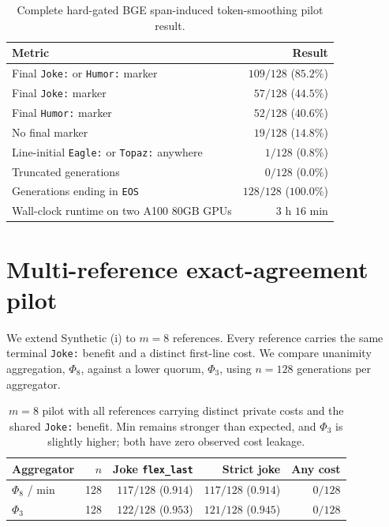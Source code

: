 \documentclass{article}
\begin{document}
\begin{table}[H]
\centering
\small
\begin{tabular}{lr}
\toprule
Metric & Result \\
\midrule
Final \texttt{Joke:} or \texttt{Humor:} marker & $109/128$ ($85.2\%$) \\
Final \texttt{Joke:} marker & $57/128$ ($44.5\%$) \\
Final \texttt{Humor:} marker & $52/128$ ($40.6\%$) \\
No final marker & $19/128$ ($14.8\%$) \\
Line-initial \texttt{Eagle:} or \texttt{Topaz:} anywhere & $1/128$ ($0.8\%$) \\
Truncated generations & $0/128$ ($0.0\%$) \\
Generations ending in \texttt{EOS} & $128/128$ ($100.0\%$) \\
Wall-clock runtime on two A100 80GB GPUs & $3$ h $16$ min \\
\bottomrule
\end{tabular}
\caption{Complete hard-gated BGE span-induced token-smoothing pilot result.}
\label{tab:span-token-bge-smoke}
\end{table}

\section{Multi-reference exact-agreement pilot}
\label{app:m8-experiment}

We extend Synthetic (i) to $m=8$ references. Every reference carries the same
terminal \texttt{Joke:} benefit and a distinct first-line cost. We compare
unanimity aggregation, $\Phi_8$, against a lower quorum, $\Phi_3$, using
$n=128$ generations per aggregator.

\begin{table}[H]
\centering
\small
\begin{tabular}{lrrrr}
\toprule
Aggregator & $n$ & Joke \texttt{flex\_last} & Strict joke & Any cost \\
\midrule
$\Phi_8$ / min & 128 & $117/128$ ($0.914$) & $117/128$ ($0.914$) & $0/128$ \\
$\Phi_3$       & 128 & $122/128$ ($0.953$) & $121/128$ ($0.945$) & $0/128$ \\
\bottomrule
\end{tabular}
\caption{$m=8$ pilot with all references carrying distinct private costs and
the shared \texttt{Joke:} benefit. Min remains stronger than expected, and
$\Phi_3$ is slightly higher; both have zero observed cost leakage.}
\label{tab:m8-pilot}
\end{table}
\end{document}
